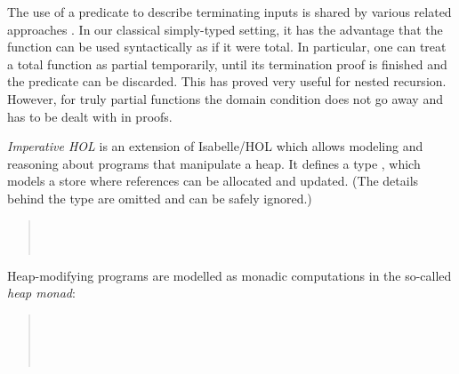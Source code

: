 \documentclass[copyright,creativecommons,sharealike]{eptcs}
\theoremstyle{remark}
\begin{document}
\begin{isabellebody}
\begin{isamarkuptext}
  The use of a predicate to describe terminating inputs is shared by
  various related
  approaches \cite{ConstableM85,dubois98,bovecapretta05,Greve09_defminterm}.
  In our classical simply-typed setting, it has the advantage
  that the function can be used syntactically as if it were total.  In
  particular, one can treat a total function as partial
  temporarily, until its termination proof is finished and the
  predicate can be discarded. This has proved very useful for nested
  recursion.  However, for truly partial functions the domain
  condition does not go away and has to be dealt with in proofs.\end{isamarkuptext}\isamarkuptrue {}
\isamarkuptrue \label{sec:imphol}
\begin{isamarkuptext}\emph{Imperative HOL} \cite{imperativeFP} is an extension of
  Isabelle/HOL
  which allows modeling and reasoning about programs that manipulate a
  heap. It defines a type , which models a store where
  references can be allocated and updated.
  (The details behind the type  are omitted and can be safely ignored.)
  \begin{quote}
    \\
    \\
  \end{quote}
  Heap-modifying programs are modelled as monadic computations in
  the so-called \emph{heap monad}:
\begin{quote}
  \\[4pt]
  \\
  \\[4pt]

\end{quote}
\end{isamarkuptext}
\end{isabellebody}
\end{document}
